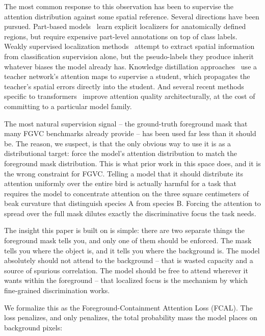 \documentclass[journal]{IEEEtran}
\begin{document}
The most common response to this observation has been to supervise
the attention distribution against some spatial reference. Several
directions have been pursued. Part-based models~\cite{zhang2014part}
learn explicit localizers for anatomically defined regions, but
require expensive part-level annotations on top of class labels.
Weakly supervised localization methods~\cite{zhou2016learning,
kolesnikov2016seed} attempt to extract spatial information from
classification supervision alone, but the pseudo-labels they produce
inherit whatever biases the model already has. Knowledge
distillation approaches~\cite{zagoruyko2017paying} use a teacher
network's attention maps to supervise a student, which propagates
the teacher's spatial errors directly into the student. And several
recent methods specific to transformers~\cite{liu2021swin,
dosovitskiy2020vit} improve attention quality architecturally, at
the cost of committing to a particular model family.

The most natural supervision signal -- the ground-truth foreground
mask that many FGVC benchmarks already provide -- has been used
far less than it should be. The reason, we suspect, is that
the only obvious way to use it is as a distributional target:
force the model's attention distribution to match the foreground
mask distribution. This is what prior work in this space does,
and it is the wrong constraint for FGVC. Telling a model that
it should distribute its attention uniformly over the entire
bird is actually harmful for a task that requires the model to
concentrate attention on the three square centimeters of beak
curvature that distinguish species A from species B. Forcing
the attention to spread over the full mask dilutes exactly
the discriminative focus the task needs.

The insight this paper is built on is simple: there are two
separate things the foreground mask tells you, and only one of
them should be enforced. The mask tells you where the object is,
and it tells you where the background is. The model absolutely
should not attend to the background -- that is wasted capacity
and a source of spurious correlation. The model should be free
to attend wherever it wants within the foreground -- that
localized focus is the mechanism by which fine-grained
discrimination works.

We formalize this as the Foreground-Containment Attention Loss
(FCAL). The loss penalizes, and only penalizes, the total
probability mass the model places on background pixels:
\end{document}
